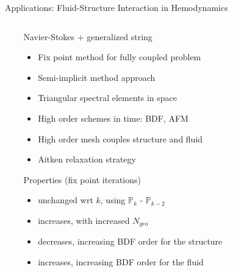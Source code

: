 \documentclass[final,utf8,,hyperref={pdfpagelabels=false}]{beamer}
\begin{document}
\begin{frame}[containsverbatim]{}
\begin{columns}[t]
\begin{block}{Applications: Fluid-Structure Interaction in Hemodynamics}
\begin{columns}[c]
\begin{column}{.40\linewidth}
        
      \end{column}
      \begin{column}{.55\textwidth}
        \vspace{-2.5cm}
        \begin{block}{Navier-Stokes + generalized string}
          \begin{itemize}
	      \item Fix point method for fully coupled problem
	      \item Semi-implicit method approach
	      \item Triangular spectral elements in space
	      \item High order schemes in time: BDF, AFM
	      \item High order mesh couples structure and fluid
	      \item Aitken relaxation strategy
          \end{itemize}
        \end{block}
        \begin{block}{Properties (fix point iterations)}
          \begin{itemize}
	      \item unchanged wrt $k$, using $\mathbb P_k$ - $\mathbb P_{k-2}$
	      \item increases, with increased $N_{geo}$
	      \item decreases, increasing  BDF order for the structure
	      \item increases, increasing BDF order for the fluid
          \end{itemize}
        \end{block}
      \end{column}
    \end{columns}
  \end{block}
  \vfill


\end{columns}
\end{frame}
\end{document}
